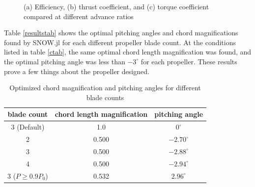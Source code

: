 \documentclass[journal ]{new-aiaa}
\newcounter{ctab}
\begin{document}
\begin{figure}[H]
\centering

	\hspace{1em}
	\caption{(a) Efficiency, (b) thrust coefficient, and (c) torque coefficient compared at different advance ratios}
	\captionsetup{aboveskip=0pt,font=it}
	\label{efftqtab}
\end{figure}

Table \eqref{resultstab} shows the optimal pitching angles and chord magnifications found by SNOW.jl for each different propeller blade count. At the conditions listed in table \eqref{ctab}, the same optimal chord length magnification was found, and the optimal pitching angle was less than $-3^{\circ}$ for each propeller. These results prove a few things about the propeller designed.

\begin{table}[H]
 \centering
 \begin{tabular}{| c | c | c |} \hline
 	 \textbf{blade count} & \textbf{chord length magnification} & \textbf{pitching angle} \\ \hline
  	 3 (Default) & 1.0 & $0^{\circ}$ \\ \hline
  	 2 & 0.500 & $-2.70^{\circ}$ \\ \hline
  	 3 & 0.500 & $-2.88^{\circ}$ \\ \hline
  	 4 & 0.500 & $-2.94^{\circ}$ \\ \hline
	 3 ($P \geq 0.9 P_{0}$) & 0.532 & $2.96^{\circ}$ \\ \hline
 \end{tabular}
 \caption{Optimized chord magnification and pitching angles for different blade counts}
 \label{resultstab}
\end{table}
\end{document}
